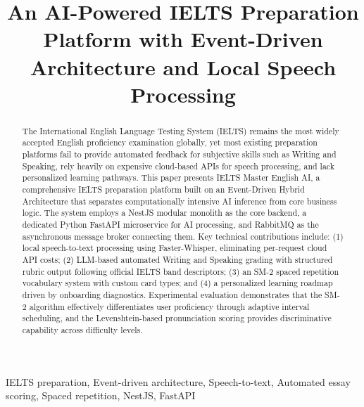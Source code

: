 \documentclass[conference]{IEEEtran}
\begin{document}
\title{An AI-Powered IELTS Preparation Platform with Event-Driven Architecture and Local Speech Processing}

\author{
}

\maketitle

\begin{abstract}
The International English Language Testing System (IELTS) remains the most widely accepted English proficiency examination globally, yet most existing preparation platforms fail to provide automated feedback for subjective skills such as Writing and Speaking, rely heavily on expensive cloud-based APIs for speech processing, and lack personalized learning pathways. This paper presents IELTS Master English AI, a comprehensive IELTS preparation platform built on an Event-Driven Hybrid Architecture that separates computationally intensive AI inference from core business logic. The system employs a NestJS modular monolith as the core backend, a dedicated Python FastAPI microservice for AI processing, and RabbitMQ as the asynchronous message broker connecting them. Key technical contributions include: (1) local speech-to-text processing using Faster-Whisper, eliminating per-request cloud API costs; (2) LLM-based automated Writing and Speaking grading with structured rubric output following official IELTS band descriptors; (3) an SM-2 spaced repetition vocabulary system with custom card types; and (4) a personalized learning roadmap driven by onboarding diagnostics. Experimental evaluation demonstrates that the SM-2 algorithm effectively differentiates user proficiency through adaptive interval scheduling, and the Levenshtein-based pronunciation scoring provides discriminative capability across difficulty levels.
\end{abstract}

\begin{IEEEkeywords}
IELTS preparation, Event-driven architecture, Speech-to-text, Automated essay scoring, Spaced repetition, NestJS, FastAPI
\end{IEEEkeywords}

\end{document}
